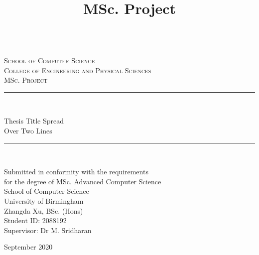 \documentclass[twoside,11pt,a4paper]{article}
\title{MSc. Project\\\bhamthesistitle}
\author{\textsf{\bhamstudentname {\textsf{Degree Postnomials}}}}
\date{}
\newcommand{\bhamstudentname}{Zhangda Xu}
\newcommand{\bhamfronttitle}{Thesis Title Spread\\Over Two Lines}
\newcommand{\bhamschool}{School of Computer Science}
\newcommand{\bhamcollege}{Engineering and Physical Sciences}
\newcommand{\bhamdegree}{MSc. Advanced Computer Science}
\newcommand{\bhamid}{2088192}
\newcommand{\bhamsupervisor}{Dr M. Sridharan}
\newcommand{\bhamyear}{2020}
\newcommand{\HRule}{\rule{\linewidth}{0.5mm}}
\begin{document}
\begin{titlepage}
\begin{center}
\begin{minipage}{6in}
  \centering
  \hspace*{.2in}
  \end{minipage}
  \\ [1.0cm]
\textsc{{\LARGE \bhamschool\\}College of \bhamcollege}\\[3.5cm]

\textsc{\Large MSc. Project}\\[0.5cm]

\HRule \\[0.4cm]
\begin{center}\Huge
\bhamfronttitle
\end{center}
\HRule \\[1.5cm]

\begin{center}
Submitted in conformity with the requirements\\ for the degree of \bhamdegree\\
\bhamschool\\ University of Birmingham\\
\vspace{2cm}
\bhamstudentname, BSc. (Hons)\\
Student ID: \bhamid\\
Supervisor: \bhamsupervisor
\end{center}
\vfill

{\large September \bhamyear}

\end{center}
\end{titlepage}
\end{document}
